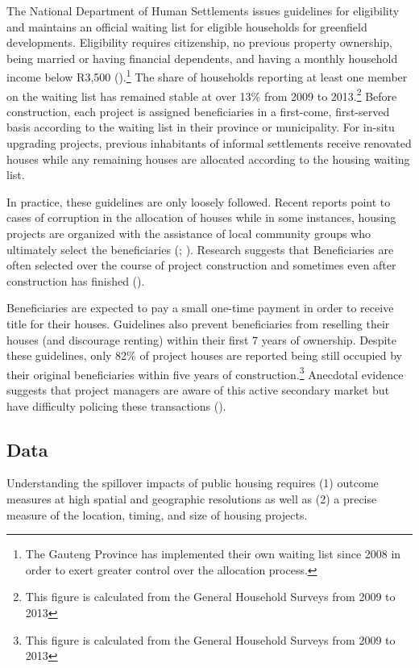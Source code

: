 \documentclass[12pt]{article}
\begin{document}
The National Department of Human Settlements issues guidelines for eligibility and maintains an official waiting list for eligible households for greenfield developments.  Eligibility requires citizenship, no previous property ownership, being married or having financial dependents, and having a monthly household income below R3,500 (\cite{seriq}).\footnote{The Gauteng Province has implemented their own waiting list since 2008 in order to exert greater control over the allocation process.}  The share of households reporting at least one member on the waiting list has remained stable at over 13\% from 2009 to 2013.\footnote{This figure is calculated from the General Household Surveys from 2009 to 2013}  Before construction, each project is assigned beneficiaries in a first-come, first-served basis according to the waiting list in their province or municipality.  For in-situ upgrading projects, previous inhabitants of informal settlements receive renovated houses while any remaining houses are allocated according to the housing waiting list.

In practice, these guidelines are only loosely followed.  Recent reports point to cases of corruption in the allocation of houses while in some instances, housing projects are organized with the assistance of local community groups who ultimately select the beneficiaries (\cite{seriq}; \cite{casestudytinazonke}).  Research suggests that Beneficiaries are often selected over the course of project construction and sometimes even after construction has finished (\cite{seriq}).

Beneficiaries are expected to pay a small one-time payment in order to receive title for their houses.  Guidelines also prevent beneficiaries from reselling their houses (and discourage renting) within their first 7 years of ownership.  Despite these guidelines, only 82\% of project houses are reported being still occupied by their original beneficiaries within five years of construction.\footnote{This figure is calculated from the General Household Surveys from 2009 to 2013}  Anecdotal evidence suggests that project managers are aware of this active secondary market but have difficulty policing these transactions (\cite{resale}).

\subsection{Data}

Understanding the spillover impacts of public housing requires (1) outcome measures at high spatial and geographic resolutions as well as (2) a precise measure of the location, timing, and size of housing projects.  
\end{document}
